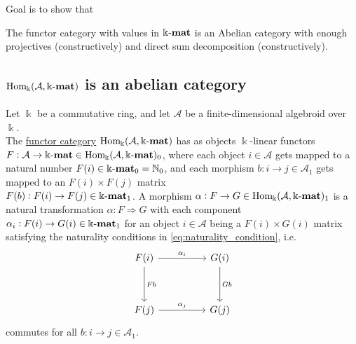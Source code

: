 \label{sect:abelian_cat}
Goal is to show that

The functor category with values in $\Bbbk\textnormal{-}\mathbf{mat}$ is an Abelian category with enough projectives (constructively) and direct sum decomposition (constructively).

\subsection{$\mathrm{Hom_{\Bbbk}}(\mathcal{A},\Bbbk\textnormal{-}\mathbf{mat})$ is an abelian category}

\begin{definition}
Let $\Bbbk$ be a commutative ring, and let $\mathcal{A}$ be a finite-dimensional algebroid over $\Bbbk$.\\
The \ul{functor category} $\mathrm{Hom_{\Bbbk}}(\mathcal{A},\Bbbk\textnormal{-}\mathbf{mat})$ has as objects $\Bbbk$-linear functors\\
$F : \mathcal{A} \rightarrow \Bbbk\textnormal{-}\mathbf{mat} \in \mathrm{Hom_{\Bbbk}}(\mathcal{A},\Bbbk\textnormal{-}\mathbf{mat})_{0}$, where each
object $i \in \mathcal{A}$ gets mapped to a natural number $F(i) \in \Bbbk\textnormal{-}\mathbf{mat}_{0} = \mathbb{N}_{0}$, and each
morphism $b : i \rightarrow j \in \mathcal{A}_{1}$ gets mapped to an $F(i) \times F(j)$ matrix\\
$F(b) : F(i) \rightarrow F(j) \in \Bbbk\textnormal{-}\mathbf{mat}_{1}$.
A morphism $\alpha : F \rightarrow G \in \mathrm{Hom_{\Bbbk}}(\mathcal{A},\Bbbk\textnormal{-}\mathbf{mat})_{1}$ is a natural transformation $\alpha : F \Rightarrow G$ with each component
$\alpha_{i} : F(i) \rightarrow G(i) \in \Bbbk\textnormal{-}\mathbf{mat}_{1}$ for an object $i \in \mathcal{A}$ being a $F(i) \times G(i)$ matrix satisfying the
naturality conditions in \eqref{eq:naturality_condition}, i.e.
\[
\begin{tikzcd}
F(i) \arrow[rr, "\alpha_{i}"] \arrow[dd, "Fb"] &  & G(i) \arrow[dd, "Gb"] \\
                                             &  &                     \\
F(j) \arrow[rr, "\alpha_{j}"]                &  & G(j)                
\end{tikzcd}
\]
commutes for all $b : i \rightarrow j \in \mathcal{A}_{1}$.
\end{definition}

